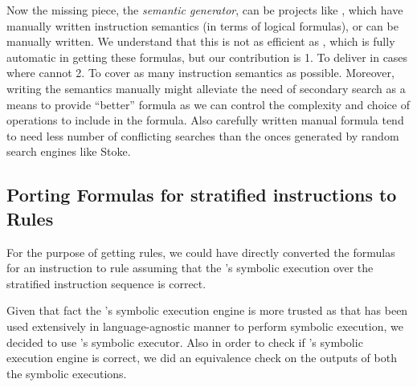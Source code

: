    Now the missing piece, the  \emph{semantic generator}, can be  projects like \Stoke, which have manually written instruction semantics (in terms of logical formulas), or can be manually written.  We understand that this is not as efficient as \Stoke, which is fully automatic in getting these formulas, but our contribution is 1. To deliver in cases where \Stoke cannot   2. To cover  as many instruction semantics as possible. Moreover, writing the semantics manually might alleviate the need of secondary search as a means to provide ``better'' formula as we can control the complexity and choice of operations to include in the formula. Also carefully written manual formula tend to need less number of conflicting searches than the onces generated by random search engines like Stoke.
   
  

\subsection{Porting Formulas for stratified instructions to \K Rules}

For the purpose of getting  \K rules, we could have directly converted the \Strata formulas
for an instruction to \K rule assuming that the \Strata's symbolic execution over the 
stratified instruction sequence is correct.

Given that fact the \K's symbolic execution engine is more trusted as 
that has been used extensively in language-agnostic manner to perform symbolic
execution, we decided to use \K's symbolic executor. Also in order to check 
if \Strata's symbolic execution engine is correct, we did an equivalence check on 
the outputs of both the symbolic executions.   
 


